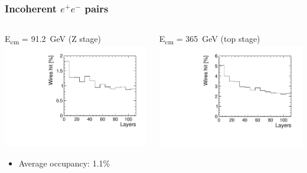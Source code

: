 \documentclass[hyperref={colorlinks=true,pdfpagelabels=false,linkcolor=black}, xcolor=dvipsnames,10pt]{beamer}
\begin{document}
\begin{frame}
	\frametitle{Incoherent $e^+e^-$ pairs}

  \begin{columns}
      \begin{block}{E\textsubscript{cm} = 91.2~GeV (Z stage)}
        \centering
        \includegraphics[width=\textwidth]{./figures/IPC_Z.pdf}
        \begin{itemize}
          \item Average occupancy: 1.1\%
        \end{itemize}
      \end{block}

    \begin{block}{E\textsubscript{cm} = 365~GeV (top stage)}
      \centering
      \includegraphics[width=\textwidth]{./figures/IPC_top.pdf}


\end{block}
\end{columns}
\end{frame}
\end{document}
